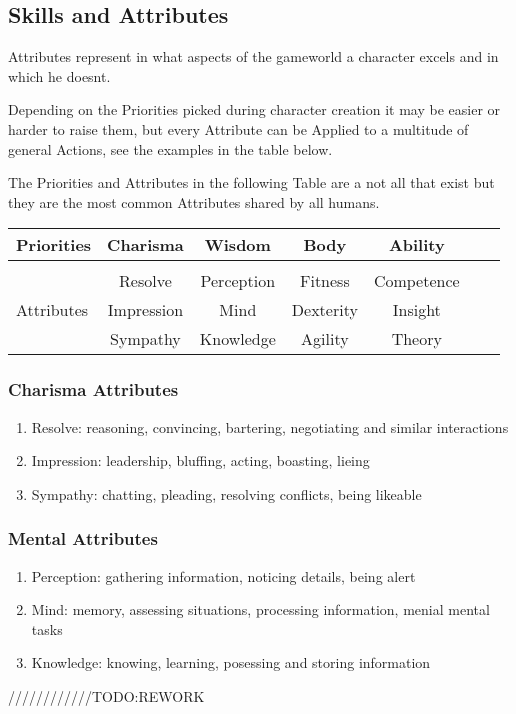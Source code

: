     \subsection{Skills and Attributes}\label{subsec:skillsAndAttributes}
    Attributes represent in what aspects of the gameworld a character excels and in which he doesnt.\par
    Depending on the Priorities picked during character creation it may be easier or harder to raise them, but every
    Attribute can be Applied to a multitude of general Actions, see the examples in the table below.\par
    The Priorities and Attributes in the following Table are a not all that exist
    but they are the most common Attributes shared by all humans.\vspace{1cm}
    \begin{tabular}{l||cccccc}
        Priorities      &Charisma      &Wisdom         &Body        &Ability    \\\hline\\
                        &Resolve       &Perception     &Fitness     &Competence   \\
        Attributes      &Impression    &Mind           &Dexterity   &Insight   \\
                        &Sympathy      &Knowledge      &Agility     &Theory   \\



    \end{tabular}\vspace{1cm}
    \subsubsection{Charisma Attributes}
        \begin{enumerate}[label= -]
            \item {Resolve}: reasoning, convincing, bartering, negotiating and similar interactions
            \item {Impression}: leadership, bluffing, acting, boasting, lieing
            \item {Sympathy}: chatting, pleading, resolving conflicts, being likeable
        \end{enumerate}
    \subsubsection{Mental Attributes} 
        \begin{enumerate}[label=-]
            \item {Perception}: gathering information, noticing details, being alert
            \item {Mind}: memory, assessing situations, processing information, menial mental tasks
            \item {Knowledge}: knowing, learning, posessing and storing information
        \end{enumerate}
    ////////////TODO:REWORK

